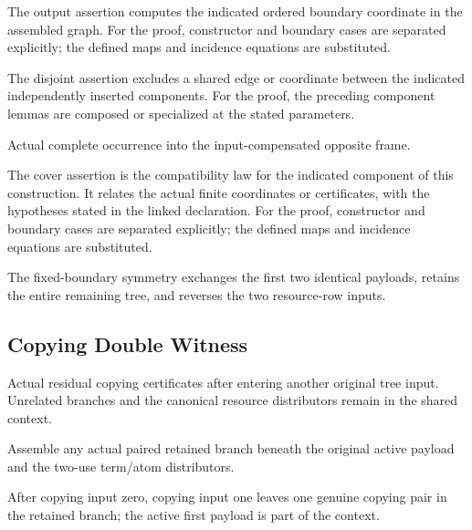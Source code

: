 The output assertion computes the indicated ordered boundary coordinate in the assembled graph.
For the proof, constructor and boundary cases are separated explicitly; the defined maps and incidence equations are substituted.
\par{}

The disjoint assertion excludes a shared edge or coordinate between the indicated independently inserted components.
For the proof, the preceding component lemmas are composed or specialized at the stated parameters.
\par{}

Actual complete occurrence into the input-compensated opposite frame.
\par{}

The cover assertion is the compatibility law for the indicated component of this construction. It relates the actual finite coordinates or certificates, with the hypotheses stated in the linked declaration.
For the proof, constructor and boundary cases are separated explicitly; the defined maps and incidence equations are substituted.
\par{}

The fixed-boundary symmetry exchanges the first two identical payloads, retains the entire remaining tree, and reverses the two resource-row inputs.
\par{}

\subsection{Copying Double Witness}
Actual residual copying certificates after entering another original tree input. Unrelated branches and the canonical resource distributors remain in the shared context.

Assemble any actual paired retained branch beneath the original active payload and the two-use term/atom distributors.
\par{}

After copying input zero, copying input one leaves one genuine copying pair in the retained branch; the active first payload is part of the context.
\par{}

